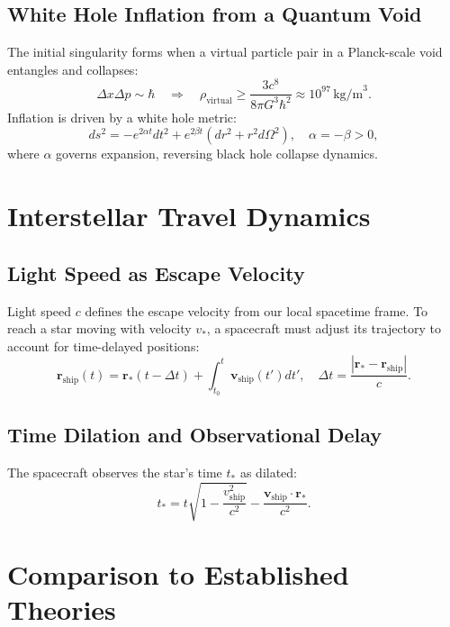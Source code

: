 \documentclass{article}
\begin{document}
\subsection{White Hole Inflation from a Quantum Void}
The initial singularity forms when a virtual particle pair in a Planck-scale void entangles and collapses:
\begin{equation}
\Delta x \Delta p \sim \hbar \quad \Rightarrow \quad \rho_{\text{virtual}} \geq \frac{3c^8}{8\pi G^3 \hbar^2} \approx 10^{97} \, \text{kg/m}^3. \label{eq:singularity}
\end{equation}
Inflation is driven by a white hole metric:
\begin{equation}
ds^2 = -e^{2\alpha t} dt^2 + e^{2\beta t} \left( dr^2 + r^2 d\Omega^2 \right), \quad \alpha = -\beta > 0, \label{eq:metric}
\end{equation}
where \( \alpha \) governs expansion, reversing black hole collapse dynamics.

\section{Interstellar Travel Dynamics}
\subsection{Light Speed as Escape Velocity}
Light speed \( c \) defines the escape velocity from our local spacetime frame. To reach a star moving with velocity \( v_* \), a spacecraft must adjust its trajectory to account for time-delayed positions:
\begin{equation}
\bm{r}_{\text{ship}}(t) = \bm{r}_*(t - \Delta t) + \int_{t_0}^{t} \bm{v}_{\text{ship}}(t') dt', \quad \Delta t = \frac{|\bm{r}_* - \bm{r}_{\text{ship}}|}{c}. \label{eq:travel}
\end{equation}

\subsection{Time Dilation and Observational Delay}
The spacecraft observes the star’s time \( t_* \) as dilated:
\begin{equation}
t_* = t \sqrt{1 - \frac{v_{\text{ship}}^2}{c^2}} - \frac{\bm{v}_{\text{ship}} \cdot \bm{r}_*}{c^2}. \label{eq:dilation}
\end{equation}

\section{Comparison to Established Theories}
\end{document}
